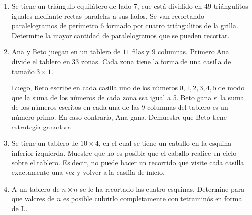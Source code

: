 \begin{enumerate}
	\item Se tiene un tri\'angulo equil\'atero de lado 7, que est\'a dividido en 49 tri\'angulitos iguales mediante rectas paralelas a sus lados. Se van recortando paralelogramos de per\'imetro 6 formado por cuatro tri\'angulitos de la grilla. Determine la mayor cantidad de paralelogramos que se pueden recortar.
	
	\item Ana y Beto juegan en un tablero de $11$ filas y $9$ columnas. Primero Ana divide el tablero en $33$ zonas. Cada zona tiene la forma de una casilla de tamaño $3\times 1$. 
	
	Luego, Beto escribe en cada casilla uno de los n\'umeros $0, 1, 2, 3, 4, 5$ de modo que la suma de los n\'umeros de cada zona sea igual a 5. Beto gana si la suma de los n\'umeros escritos en cada una de las 9 columnas del tablero es un n\'umero primo. En caso contrario, Ana gana. Demuestre que Beto tiene estrategia ganadora. 
	
	\item Se tiene un tablero de $10\times 4$, en el cual se tiene un caballo en la esquina inferior izquierda. Muestre que no es posible que el caballo realice un ciclo sobre el tablero. Es decir, no puede hacer un recorrido que visite cada casilla exactamente una vez y volver a la casilla de inicio.
	
	\item A un tablero de $n\times n$ se le ha recortado las cuatro esquinas. Determine para que valores de $n$ es posible cubrirlo completamente con tetramin\'os en forma de L.
\end{enumerate}
